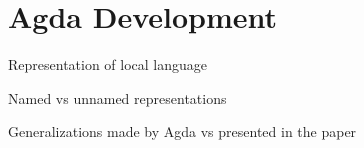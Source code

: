 \section{Agda Development}
\label{sec:agda-dev}

\todo Representation of local language

\todo Named vs unnamed representations

\todo Generalizations made by Agda vs presented in the paper

